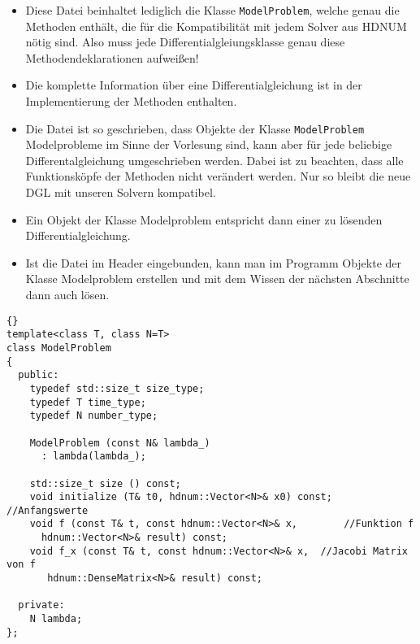 \documentclass[a4paper,11pt]{article}
\theoremstyle{definition}
\begin{document}
\begin{itemize}
\item Diese Datei beinhaltet lediglich die Klasse
  \lstinline{ModelProblem}, welche genau die Methoden enthält, die für
  die Kompatibilität mit jedem Solver aus HDNUM nötig sind. Also muss
  jede Differentialgleiungsklasse genau diese Methodendeklarationen
  aufweißen!
\item Die komplette Information über eine Differentialgleichung ist in
  der Implementierung der Methoden enthalten.
\item Die Datei ist so geschrieben, dass Objekte der Klasse
  \lstinline{ModelProblem} Modelprobleme im Sinne der Vorlesung sind,
  kann aber für jede beliebige Differentalgleichung umgeschrieben
  werden. Dabei ist zu beachten, dass alle Funktionsköpfe der Methoden
  nicht verändert werden. Nur so bleibt die neue DGL mit unseren
  Solvern kompatibel.
\item Ein Objekt der Klasse Modelproblem entspricht dann einer zu
  lösenden Differentialgleichung.
\item Ist die Datei im Header eingebunden, kann man im Programm
  Objekte der Klasse Modelproblem erstellen und mit dem Wissen der
  nächsten Abschnitte dann auch lösen.
\end{itemize}

{\footnotesize{\begin{lstlisting}{}
template<class T, class N=T>
class ModelProblem
{
  public:
    typedef std::size_t size_type;
    typedef T time_type;
    typedef N number_type;

    ModelProblem (const N& lambda_)
      : lambda(lambda_);

    std::size_t size () const;
    void initialize (T& t0, hdnum::Vector<N>& x0) const;  //Anfangswerte
    void f (const T& t, const hdnum::Vector<N>& x,        //Funktion f
      hdnum::Vector<N>& result) const;
    void f_x (const T& t, const hdnum::Vector<N>& x,  //Jacobi Matrix von f
       hdnum::DenseMatrix<N>& result) const;

  private:
    N lambda;
};
\end{lstlisting}}}
\end{document}
